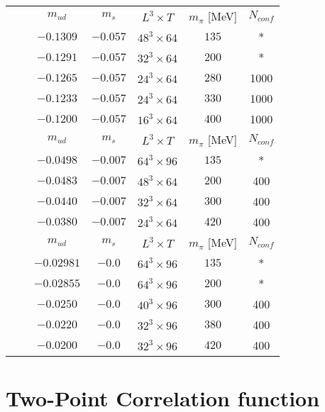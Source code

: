 \begin{tabular}{ccccccc}
 & & $m_{ud}$ & $m_{s}$ & $L^3 \times T$ & $m_\pi$ [MeV] & $N_{conf}$\\
 
& & $-0.1309$ & $-0.057$ & $48^3\times64$ & $135$ & * \\
& & $-0.1291$ & $-0.057$ & $32^3\times64$ & $200$ & * \\
& & $-0.1265$ & $-0.057$ & $24^3\times64$ & $280$ & 1000 \\
& & $-0.1233$ & $-0.057$ & $24^3\times64$ & $330$ & 1000 \\
& & $-0.1200$ & $-0.057$ & $16^3\times64$ & $400$ & 1000 \\
\midrule
{} && $m_{ud}$ & $m_{s}$ & $L^3 \times T$ & $m_\pi$ [MeV] & $N_{conf}$\\
 
& & $-0.0498$ & $-0.007$ & $64^3\times96$ & $135$ & * \\
& & $-0.0483$ & $-0.007$ & $48^3\times64$ & $200$ & 400 \\
& & $-0.0440$ & $-0.007$ & $32^3\times64$ & $300$ & 400 \\
& & $-0.0380$ & $-0.007$ & $24^3\times64$ & $420$ & 400 \\
\midrule
{} && $m_{ud}$ & $m_{s}$ & $L^3 \times T$ & $m_\pi$ [MeV] & $N_{conf}$\\
 
& & $-0.02981$ & $-0.0$ & $64^3\times96$ & $135$ & * \\
& & $-0.02855$ & $-0.0$ & $64^3\times96$ & $200$ & * \\
& & $-0.0250$ & $-0.0$ & $40^3\times96$ & $300$ & 400 \\
& & $-0.0220$ & $-0.0$ & $32^3\times96$ & $380$ & 400 \\
& & $-0.0200$ & $-0.0$ & $32^3\times96$ & $420$ & 400 \\
\end{tabular}



\section{Two-Point Correlation function} 
